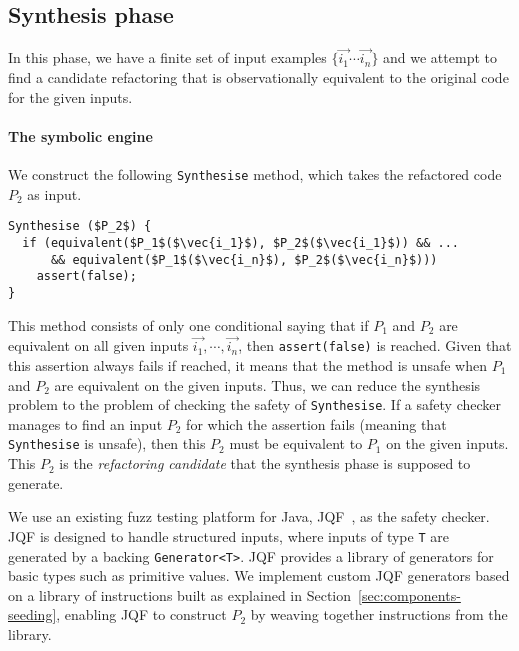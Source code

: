 \documentclass[sigconf,review,anonymous]{acmart}
\begin{document}

\subsection{Synthesis phase}\label{sec:synthesis}
In this phase, we have 
a finite set of input examples $\{\vec{i_1} \cdots \vec{i_n}\}$ and we attempt to find a candidate refactoring
that is observationally equivalent to the original code for the given inputs.

\paragraph{The symbolic engine}
We construct the following \lstinline[breaklines=true]{Synthesise} method, which
takes the refactored code $P_2$ as input.

\begin{lstlisting}[mathescape=true,showstringspaces=false]
Synthesise ($P_2$) {
  if (equivalent($P_1$($\vec{i_1}$), $P_2$($\vec{i_1}$)) && ...
      && equivalent($P_1$($\vec{i_n}$), $P_2$($\vec{i_n}$)))
    assert(false);
}
\end{lstlisting}

This method consists of only one conditional saying that if $P_1$ and $P_2$ are equivalent on all given inputs $\vec{i_1}, \cdots, \vec{i_n}$, then \lstinline[breaklines=true]{assert(false)} is reached.
Given that this assertion always fails if reached, it means that the method is unsafe when $P_1$ and $P_2$ are equivalent on the given inputs.
Thus, we can reduce the synthesis problem to the problem of checking the safety of \lstinline[breaklines=true]{Synthesise}. If a safety checker manages to
find an input $P_2$ for which the assertion fails (meaning that \lstinline[breaklines=true]{Synthesise} is unsafe), then this $P_2$ must be equivalent to $P_1$ on the given inputs. This $P_2$ is the {\em refactoring candidate}
that the synthesis phase is supposed to generate.

We use an existing fuzz testing platform for Java, JQF~\cite{DBLP:conf/issta/PadhyeLS19},
as the safety checker. JQF is designed to handle structured inputs, where inputs of type \lstinline[breaklines=true]{T}
are generated by a backing \lstinline[breaklines=true]{Generator<T>}. JQF provides a library of
generators for basic types such as primitive values. We implement custom
JQF generators based on a library of instructions built as explained in Section~\ref{sec:components-seeding},
enabling JQF to construct $P_2$ by weaving together instructions from the library.
\end{document}
